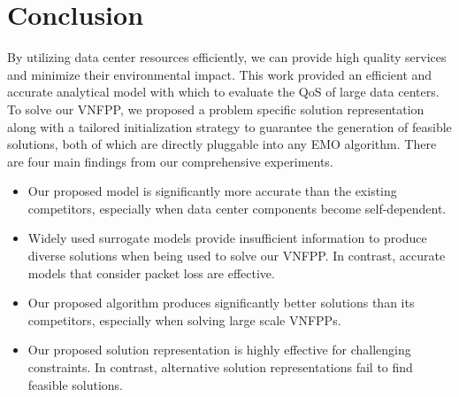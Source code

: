 
\section{Conclusion}
\label{sec:conclusion}

By utilizing data center resources efficiently, we can provide high quality services and minimize their environmental impact. This work provided an efficient and accurate analytical model with which to evaluate the QoS of large data centers. To solve our VNFPP, we proposed a problem specific solution representation along with a tailored initialization strategy to guarantee the generation of feasible solutions, both of which are directly pluggable into any EMO algorithm. There are four main findings from our comprehensive experiments.
\begin{itemize}
    \item Our proposed model is significantly more accurate than the existing competitors, especially when data center components become self-dependent.
    \item Widely used surrogate models provide insufficient information to produce diverse solutions when being used to solve our VNFPP. In contrast, accurate models that consider packet loss are effective.
    \item Our proposed algorithm produces significantly better solutions than its competitors, especially when solving large scale VNFPPs.%
    \item Our proposed solution representation is highly effective for challenging constraints. In contrast, alternative solution representations fail to find feasible solutions.
\end{itemize}

